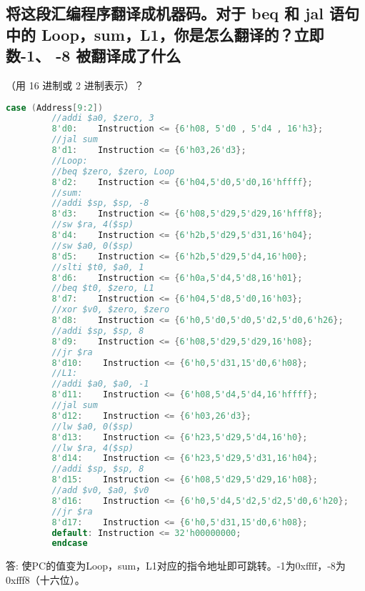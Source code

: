 \documentclass{ctexart}
\begin{document}
         \subsection{ 将这段汇编程序翻译成机器码。对于 beq 和 jal 语句中的 Loop，sum，L1，你是怎么翻译的？立即数-1、 -8 被翻译成了什么}
         （用 16 进制或 2 进制表示）？
         \begin{lstlisting}[language=verilog]
         case (Address[9:2])
         //addi $a0, $zero, 3
         8'd0:    Instruction <= {6'h08, 5'd0 , 5'd4 , 16'h3};
         //jal sum
         8'd1:    Instruction <= {6'h03,26'd3};
         //Loop:
         //beq $zero, $zero, Loop
         8'd2:    Instruction <= {6'h04,5'd0,5'd0,16'hffff};
         //sum:
         //addi $sp, $sp, -8
         8'd3:    Instruction <= {6'h08,5'd29,5'd29,16'hfff8};
         //sw $ra, 4($sp)
         8'd4:    Instruction <= {6'h2b,5'd29,5'd31,16'h04};
         //sw $a0, 0($sp)
         8'd5:    Instruction <= {6'h2b,5'd29,5'd4,16'h00};
         //slti $t0, $a0, 1
         8'd6:    Instruction <= {6'h0a,5'd4,5'd8,16'h01};
         //beq $t0, $zero, L1
         8'd7:    Instruction <= {6'h04,5'd8,5'd0,16'h03};
         //xor $v0, $zero, $zero
         8'd8:    Instruction <= {6'h0,5'd0,5'd0,5'd2,5'd0,6'h26};
         //addi $sp, $sp, 8
         8'd9:    Instruction <= {6'h08,5'd29,5'd29,16'h08};
         //jr $ra
         8'd10:    Instruction <= {6'h0,5'd31,15'd0,6'h08};
         //L1:
         //addi $a0, $a0, -1
         8'd11:    Instruction <= {6'h08,5'd4,5'd4,16'hffff};
         //jal sum
         8'd12:    Instruction <= {6'h03,26'd3};
         //lw $a0, 0($sp)
         8'd13:    Instruction <= {6'h23,5'd29,5'd4,16'h0};
         //lw $ra, 4($sp)
         8'd14:    Instruction <= {6'h23,5'd29,5'd31,16'h04};
         //addi $sp, $sp, 8
         8'd15:    Instruction <= {6'h08,5'd29,5'd29,16'h08};
         //add $v0, $a0, $v0
         8'd16:    Instruction <= {6'h0,5'd4,5'd2,5'd2,5'd0,6'h20};
         //jr $ra
         8'd17:    Instruction <= {6'h0,5'd31,15'd0,6'h08};
         default: Instruction <= 32'h00000000;
         endcase 
         \end{lstlisting}

         答: 使PC的值变为Loop，sum，L1对应的指令地址即可跳转。-1为0xffff，-8为0xfff8（十六位）。
\end{document}
